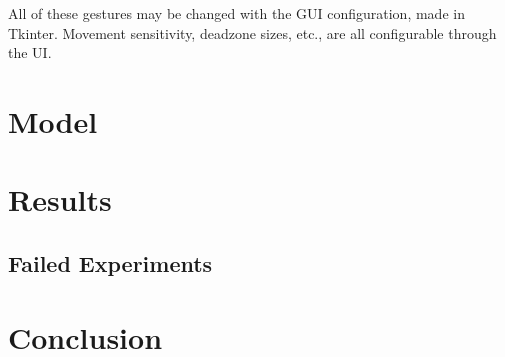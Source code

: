 \documentclass{article}
\begin{document}
All of these gestures may be changed with the GUI configuration, made in Tkinter. Movement sensitivity, deadzone sizes, etc., are all configurable through the UI.

\section{Model}


\section{Results}
\subsection{Failed Experiments}
\section{Conclusion}


\pagebreak
\nocite{*} %
\printbibliography %
\end{document}
